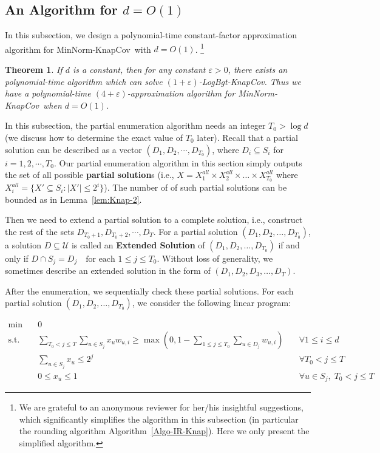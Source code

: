\documentclass[11pt,a4paper]{article} \usepackage{enumitem}
\newcommand{\calU}{\mathcal{U}}
\newcommand{\minnormknapcov}{\textsf{MinNorm-KnapCov}}
\newcommand{\LBOknapcov}{\textsf{LogBgt-KnapCov}}
\newtheorem{theorem}{Theorem}[section]
\theoremstyle{definition}
\begin{document}
\subsection{An Algorithm for $d=O(1)$}
\label{sec:Knap-1}
In this subsection, we design a polynomial-time constant-factor approximation algorithm for \minnormknapcov\
with $d=O(1)$. 
\footnote{
We are grateful to an anonymous reviewer for her/his insightful suggestions, which significantly simplifies the algorithm
in this subsection (in particular the rounding algorithm
Algorithm~\ref{Algo-IR-Knap}). 
Here we only present the simplified algorithm.
}
\begin{theorem} \label{thm:knap-1}
If $d$ is a constant, then for any 
constant $\varepsilon>0$, there exists an polynomial-time algorithm which can solve $(1+\varepsilon)$-\LBOknapcov . Thus we have a polynomial-time $(4+\varepsilon)$-approximation algorithm for \minnormknapcov\ when $d=O(1)$.
\end{theorem}
In this subsection, the partial enumeration algorithm needs an integer $T_0>\log d$ (we discuss  how to determine the exact value of $T_0$ later). Recall that a partial solution can be described as a vector $(D_1,D_2,\cdots, D_{T_0})$, where $D_i\subseteq S_i$ for $i=1,2,\cdots, T_0$.
Our partial enumeration algorithm 
in this section simply outputs 
the set of all possible \textbf{partial solution}s 
(i.e., $X=X^{all}_1\times X^{all}_2\times \ldots \times X^{all}_{T_0}$ where $X^{all}_i=\lbrace X'\subseteq S_i: |X'|\le 2^i\rbrace$). The number of of such partial solutions 
can be bounded as in Lemma~\ref{lem:Knap-2}.  

Then we need to extend a partial solution to a complete solution, i.e., construct the rest of the sets $D_{T_0+1},D_{T_0+2},\cdots,D_T$.
For a partial solution $(D_1, D_2, \dots, D_{T_0})$, a solution $D \subseteq \calU$ is called an \textbf{Extended Solution} of $(D_1, D_2, \dots, D_{T_0})$ if and only if $D \cap S_j = D_j \quad \text{for each } 1 \leq j \leq T_0$. 
Without loss of generality, we sometimes describe an extended solution in the form of $(D_1, D_2, D_3, \dots, D_T)$. 

After the enumeration, we sequentially check these partial solutions. For each partial solution $(D_1, D_2, \dots, D_{T_0})$, 
we consider the following linear program:

\begin{equation}
\begin{aligned}
    \min \quad & 0 \\
    \text{s.t.} \quad & \sum_{T_0 < j \leq T} \sum_{u \in S_j} x_u w_{u,i} \geq \max \left(0,1-\sum_{1\le j\le T_0} \sum_{u\in D_j} w_{u,i}\right) \quad & \forall 1 \leq i \leq d \\
    & \sum_{u \in S_j} x_u \leq 2^j \quad & \forall T_0 < j \leq T \\
    & 0 \leq x_u \leq 1 \quad & \forall u \in S_j, \; T_0 < j \leq T
\end{aligned}
\tag{LP-KnapCover}
\label{LP-KnapCover}
\end{equation}
\end{document}
